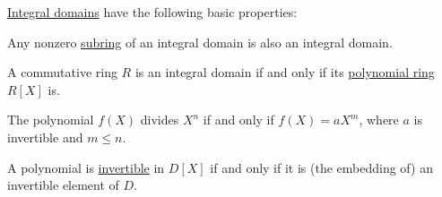 \begin{proposition}\label{thm:def:integral_domain}
  \hyperref[def:integral_domain]{Integral domains} have the following basic properties:
  \begin{thmenum}
     Any nonzero \hyperref[def:ring/subobject]{subring} of an integral domain is also an integral domain.

     A commutative ring \( R \) is an integral domain if and only if its \hyperref[def:polynomial_algebra]{polynomial ring} \( R[X] \) is.

     The polynomial \( f(X) \) divides \( X^n \) if and only if \( f(X) = aX^m \), where \( a \) is invertible and \( m \leq n \).

     A polynomial is \hyperref[def:semiring_divisibility/invertible]{invertible} in \( D[X] \) if and only if it is (the embedding of) an invertible element of \( D \).
  \end{thmenum}
\end{proposition}

